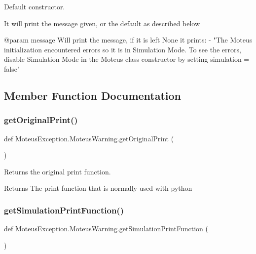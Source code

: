 Default constructor. 

It will print the message given, or the default as described below \begin{DoxyVerb}       @param  message Will print the message, if it is left None it prints:
           - "The Moteus initialization encountered errors so it is in Simulation Mode. To see the errors, disable Simulation Mode in the Moteus class constructor by setting simulation = false"\end{DoxyVerb}
 

\subsection{Member Function Documentation}
\mbox{\label{classMoteusException_1_1MoteusWarning_aac19a61457cd87b430e92392c5ce1c04}} 
\subsubsection{\texorpdfstring{get\+Original\+Print()}{getOriginalPrint()}}
{\footnotesize\ttfamily def Moteus\+Exception.\+Moteus\+Warning.\+get\+Original\+Print (\begin{DoxyParamCaption}{ }\end{DoxyParamCaption})}



Returns the original print function. 

\begin{DoxyReturn}{Returns}
The print function that is normally used with python 
\end{DoxyReturn}
\mbox{\label{classMoteusException_1_1MoteusWarning_af50b0a168529c9856e982fb6f5f314ee}} 
\subsubsection{\texorpdfstring{get\+Simulation\+Print\+Function()}{getSimulationPrintFunction()}}
{\footnotesize\ttfamily def Moteus\+Exception.\+Moteus\+Warning.\+get\+Simulation\+Print\+Function (\begin{DoxyParamCaption}{ }\end{DoxyParamCaption})}



